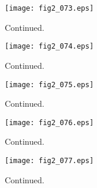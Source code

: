 \documentclass[preprint]{aastex}
\begin{document}
\setcounter{figure}{1}
\begin{figure}[t]
\centering
\texttt{[image: fig2\_073.eps]}
\caption{
Continued. 
}
\label{Fig2}
\end{figure}
\clearpage



\setcounter{figure}{1}
\begin{figure}[t]
\centering
\texttt{[image: fig2\_074.eps]}
\caption{
Continued. 
}
\label{Fig2}
\end{figure}
\clearpage



\setcounter{figure}{1}
\begin{figure}[t]
\centering
\texttt{[image: fig2\_075.eps]}
\caption{
Continued. 
}
\label{Fig2}
\end{figure}
\clearpage



\setcounter{figure}{1}
\begin{figure}[t]
\centering
\texttt{[image: fig2\_076.eps]}
\caption{
Continued. 
}
\label{Fig2}
\end{figure}
\clearpage



\setcounter{figure}{1}
\begin{figure}[t]
\centering
\texttt{[image: fig2\_077.eps]}
\caption{
Continued. 
}
\label{Fig2}
\end{figure}
\clearpage
\end{document}
